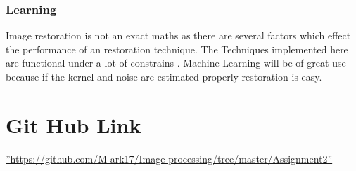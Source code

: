 \documentclass{article}
\begin{document}
\subsubsection{Learning}
Image restoration is not an exact maths as there are several factors which effect the performance of an restoration technique. The Techniques implemented here are functional under a lot of constrains . Machine Learning will be of great use because if the kernel and noise are estimated properly restoration is easy.
\section{Git Hub Link}
    \hyperref[https://github.com/M-ark17/Image-processing/tree/master/Assignment2]{''https://github.com/M-ark17/Image-processing/tree/master/Assignment2''}
\label{sec:ref}



% 
\end{document}
